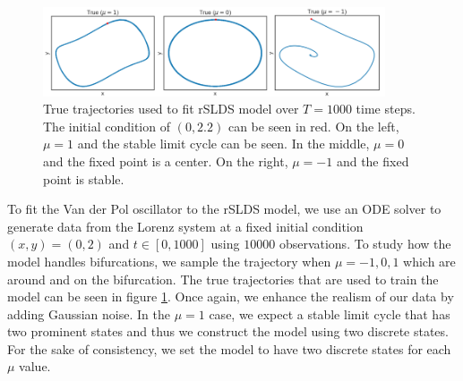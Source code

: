 \begin{figure}
    \centering
    \includegraphics[width=0.90\textwidth,height=\textwidth,keepaspectratio]{./figures/paper_fig10.png}
    \caption{True trajectories used to fit rSLDS model over $T=1000$ time steps. The initial condition of $(0,2.2)$ can be seen in red. On the left, $\mu =1$ and the stable limit cycle can be seen. In the middle, $\mu = 0$ and the fixed point is a center. On the right, $\mu = -1$ and the fixed point is stable.}
    \label{trueVDP}
\end{figure}

To fit the Van der Pol oscillator to the rSLDS model, we use an ODE solver to generate data from the Lorenz system at a fixed initial condition $(x,y) = (0,2)$ and $t \in [0,1000]$ using $10000$ observations. To study how the model handles bifurcations, we sample the trajectory when $\mu = -1,0,1$ which are around and on the bifurcation. The true trajectories that are used to train the model can be seen in figure \ref{trueVDP}. Once again, we enhance the realism of our data by adding Gaussian noise. In the $\mu = 1$ case, we expect a stable limit cycle that has two prominent states and thus we construct the model using two discrete states. For the sake of consistency, we set the model to have two discrete states for each $\mu$ value. 

